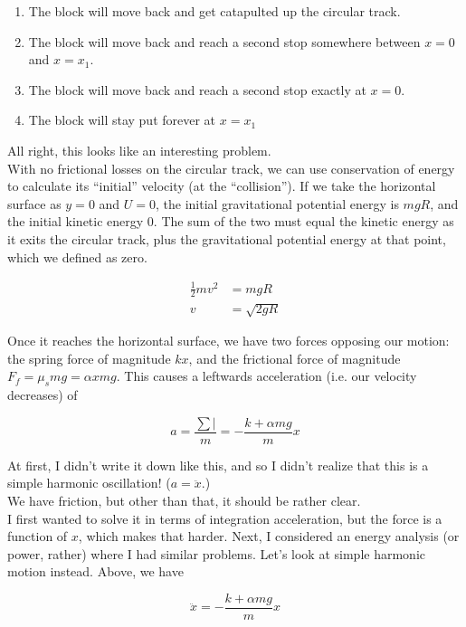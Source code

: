 \documentclass[8.01x]{subfiles}
\begin{document}
\begin{enumerate}
\item The block will move back and get catapulted up the circular track.
\item The block will move back and reach a second stop somewhere between $x = 0$ and $x = x_1$.
\item The block will move back and reach a second stop exactly at $x = 0$.
\item The block will stay put forever at $x = x_1$
\end{enumerate}

All right, this looks like an interesting problem.\\
With no frictional losses on the circular track, we can use conservation of energy to calculate its ``initial'' velocity (at the ``collision''). If we take the horizontal surface as $y = 0$ and $U = 0$, the initial gravitational potential energy is $m g R$, and the initial kinetic energy 0. The sum of the two must equal the kinetic energy as it exits the circular track, plus the gravitational potential energy at that point, which we defined as zero.

\begin{align}
\frac{1}{2} m v^2 &= m g R\\
v &= \sqrt{2 g R}
\end{align}

Once it reaches the horizontal surface, we have two forces opposing our motion: the spring force of magnitude $k x$, and the frictional force of magnitude $F_f = \mu_s m g = \alpha x m g$. This causes a leftwards acceleration (i.e. our velocity decreases) of

\begin{equation}
a = \frac{\sum |}{m} = -\frac{k + \alpha m g}{m} x
\end{equation}

At first, I didn't write it down like this, and so I didn't realize that this is a  simple harmonic oscillation! ($a = \ddot{x}$.)\\
We have friction, but other than that, it should be rather clear.\\
I first wanted to solve it in terms of integration acceleration, but the force is a function of $x$, which makes that harder. Next, I considered an energy analysis (or power, rather) where I had similar problems. Let's look at simple harmonic motion instead. Above, we have

\begin{equation}
\ddot{x} = -\frac{k + \alpha m g}{m} x
\end{equation}
\end{document}
